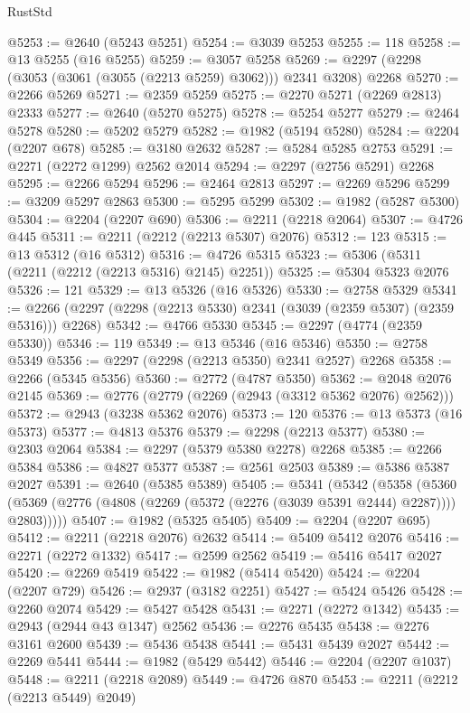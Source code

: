 \begin{lexlean}{RustStd}
\begin{coremodule}
@5253 := @2640 (@5243 @5251)
@5254 := @3039 @5253
@5255 := 118
@5258 := @13 @5255 (@16 @5255)
@5259 := @3057 @5258
@5269 := @2297 (@2298 (@3053 (@3061 (@3055 (@2213 @5259) @3062))) @2341 @3208) @2268
@5270 := @2266 @5269
@5271 := @2359 @5259
@5275 := @2270 @5271 (@2269 @2813) @2333
@5277 := @2640 (@5270 @5275)
@5278 := @5254 @5277
@5279 := @2464 @5278
@5280 := @5202 @5279
@5282 := @1982 (@5194 @5280)
@5284 := @2204 (@2207 @678)
@5285 := @3180 @2632
@5287 := @5284 @5285 @2753
@5291 := @2271 (@2272 @1299) @2562 @2014
@5294 := @2297 (@2756 @5291) @2268
@5295 := @2266 @5294
@5296 := @2464 @2813
@5297 := @2269 @5296
@5299 := @3209 @5297 @2863
@5300 := @5295 @5299
@5302 := @1982 (@5287 @5300)
@5304 := @2204 (@2207 @690)
@5306 := @2211 (@2218 @2064)
@5307 := @4726 @445
@5311 := @2211 (@2212 (@2213 @5307) @2076)
@5312 := 123
@5315 := @13 @5312 (@16 @5312)
@5316 := @4726 @5315
@5323 := @5306 (@5311 (@2211 (@2212 (@2213 @5316) @2145) @2251))
@5325 := @5304 @5323 @2076
@5326 := 121
@5329 := @13 @5326 (@16 @5326)
@5330 := @2758 @5329
@5341 := @2266 (@2297 (@2298 (@2213 @5330) @2341 (@3039 (@2359 @5307) (@2359 @5316))) @2268)
@5342 := @4766 @5330
@5345 := @2297 (@4774 (@2359 @5330))
@5346 := 119
@5349 := @13 @5346 (@16 @5346)
@5350 := @2758 @5349
@5356 := @2297 (@2298 (@2213 @5350) @2341 @2527) @2268
@5358 := @2266 (@5345 @5356)
@5360 := @2772 (@4787 @5350)
@5362 := @2048 @2076 @2145
@5369 := @2776 (@2779 (@2269 (@2943 (@3312 @5362 @2076) @2562)))
@5372 := @2943 (@3238 @5362 @2076)
@5373 := 120
@5376 := @13 @5373 (@16 @5373)
@5377 := @4813 @5376
@5379 := @2298 (@2213 @5377)
@5380 := @2303 @2064
@5384 := @2297 (@5379 @5380 @2278) @2268
@5385 := @2266 @5384
@5386 := @4827 @5377
@5387 := @2561 @2503
@5389 := @5386 @5387 @2027
@5391 := @2640 (@5385 @5389)
@5405 := @5341
    (@5342
      (@5358
        (@5360 (@5369 (@2776 (@4808 (@2269 (@5372 (@2276 (@3039 @5391 @2444) @2287)))) @2803)))))
@5407 := @1982 (@5325 @5405)
@5409 := @2204 (@2207 @695)
@5412 := @2211 (@2218 @2076) @2632
@5414 := @5409 @5412 @2076
@5416 := @2271 (@2272 @1332)
@5417 := @2599 @2562
@5419 := @5416 @5417 @2027
@5420 := @2269 @5419
@5422 := @1982 (@5414 @5420)
@5424 := @2204 (@2207 @729)
@5426 := @2937 (@3182 @2251)
@5427 := @5424 @5426
@5428 := @2260 @2074
@5429 := @5427 @5428
@5431 := @2271 (@2272 @1342)
@5435 := @2943 (@2944 @43 @1347) @2562
@5436 := @2276 @5435
@5438 := @2276 @3161 @2600
@5439 := @5436 @5438
@5441 := @5431 @5439 @2027
@5442 := @2269 @5441
@5444 := @1982 (@5429 @5442)
@5446 := @2204 (@2207 @1037)
@5448 := @2211 (@2218 @2089)
@5449 := @4726 @870
@5453 := @2211 (@2212 (@2213 @5449) @2049)

\end{coremodule}
\end{lexlean}
